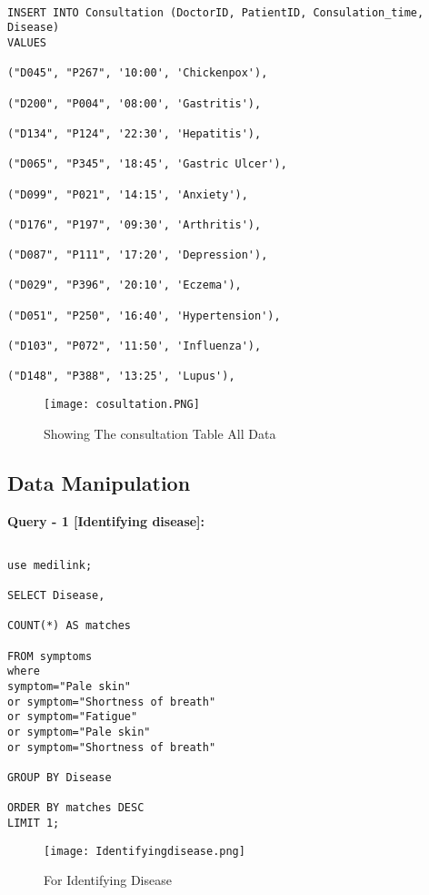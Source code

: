 \documentclass[11pt]{article}
\begin{document}
\begin{lstlisting}

INSERT INTO Consultation (DoctorID, PatientID, Consulation_time, Disease)
VALUES

("D045", "P267", '10:00', 'Chickenpox'),

("D200", "P004", '08:00', 'Gastritis'),

("D134", "P124", '22:30', 'Hepatitis'),

("D065", "P345", '18:45', 'Gastric Ulcer'),

("D099", "P021", '14:15', 'Anxiety'),

("D176", "P197", '09:30', 'Arthritis'),

("D087", "P111", '17:20', 'Depression'),

("D029", "P396", '20:10', 'Eczema'),

("D051", "P250", '16:40', 'Hypertension'),

("D103", "P072", '11:50', 'Influenza'),

("D148", "P388", '13:25', 'Lupus'),

\end{lstlisting}

\begin{figure}[H]
    \centering
    \texttt{[image: cosultation.PNG]}
    \caption{Showing The consultation Table All Data}
    \label{fig:1}
\end{figure}




\subsection{Data Manipulation}

\textbf{Query - 1 [Identifying disease]:}

\begin{lstlisting}

use medilink;

SELECT Disease, 

COUNT(*) AS matches

FROM symptoms
where
symptom="Pale skin"
or symptom="Shortness of breath"
or symptom="Fatigue"
or symptom="Pale skin"
or symptom="Shortness of breath"

GROUP BY Disease

ORDER BY matches DESC
LIMIT 1;

\end{lstlisting}
\begin{figure}[H]
    \centering
    \texttt{[image: Identifyingdisease.png]}
    \caption{For Identifying Disease}
    \label{fig:1}
\end{figure}
\end{document}
